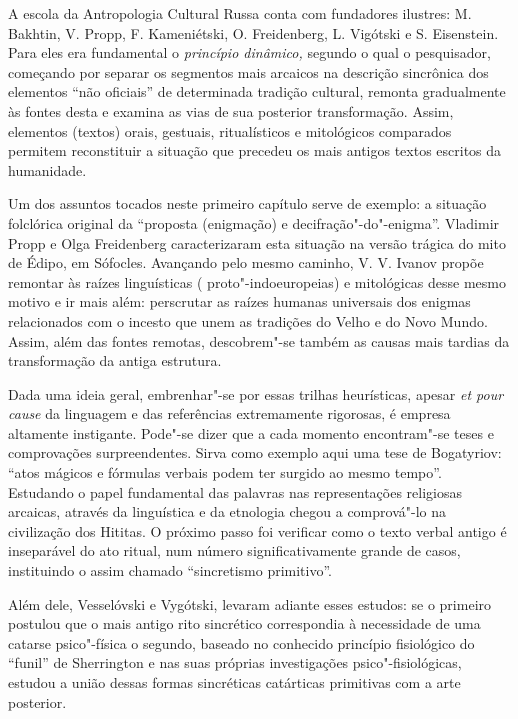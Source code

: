 A escola da Antropologia Cultural Russa conta com fundadores ilustres:
M. Bakhtin, V. Propp, F. Kameniétski, O. Freidenberg, L. Vigótski e
S. Eisenstein. Para eles era fundamental o \emph{princípio dinâmico,}
segundo o qual o pesquisador, começando por separar os segmentos mais
arcaicos na descrição sincrônica dos elementos ``não oficiais'' de
determinada tradição cultural, remonta gradualmente às fontes desta e
examina as vias de sua posterior transformação. Assim, elementos
(textos) orais, gestuais, ritualísticos e mitológicos comparados
permitem reconstituir a situação que precedeu os mais antigos textos
escritos da humanidade.

Um dos assuntos tocados neste primeiro capítulo serve de exemplo: a
situação folclórica original da ``proposta (enigmação) e
decifração"-do"-enigma''. Vladimir Propp e Olga Freidenberg caracterizaram
esta situação na versão trágica do mito de Édipo, em Sófocles. Avançando
pelo mesmo caminho, V. V. Ivanov propõe remontar às raízes linguísticas (
proto"-indoeuropeias) e mitológicas desse mesmo motivo e ir mais além:
perscrutar as raízes humanas universais dos enigmas relacionados com o
incesto que unem as tradições do Velho e do Novo Mundo. Assim, além das
fontes remotas, descobrem"-se também as causas mais tardias da
transformação da antiga estrutura.

Dada uma ideia geral, embrenhar"-se por essas trilhas heurísticas, apesar
\emph{et pour cause} da linguagem e das referências extremamente
rigorosas, é empresa altamente instigante. Pode"-se dizer que a cada
momento encontram"-se teses e comprovações surpreendentes. Sirva como
exemplo aqui uma tese de Bogatyriov: ``atos mágicos e fórmulas verbais
podem ter surgido ao mesmo tempo''. Estudando o papel fundamental das
palavras nas representações religiosas arcaicas, através da linguística
e da etnologia chegou a comprová"-lo na civilização dos Hititas. O
próximo passo foi verificar como o texto verbal antigo é inseparável do
ato ritual, num número significativamente grande de casos, instituindo o
assim chamado ``sincretismo primitivo''.

Além dele, Vesselóvski e Vygótski, levaram adiante esses estudos: se o
primeiro postulou que o mais antigo rito sincrético correspondia à
necessidade de uma catarse psico"-física o segundo, baseado no conhecido
princípio fisiológico do ``funil'' de Sherrington e nas suas próprias
investigações psico"-fisiológicas, estudou a união dessas formas
sincréticas catárticas primitivas com a arte posterior.

